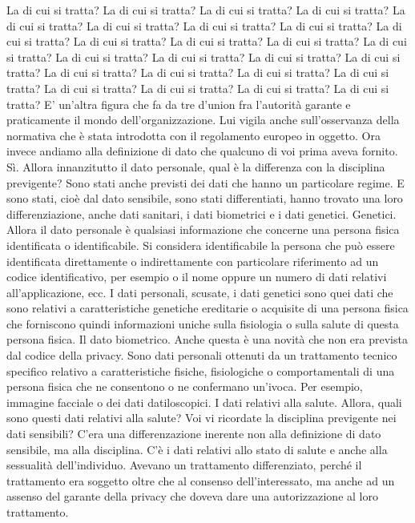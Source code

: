 La di cui si tratta?
La di cui si tratta?
La di cui si tratta?
La di cui si tratta?
La di cui si tratta?
La di cui si tratta?
La di cui si tratta?
La di cui si tratta?
La di cui si tratta?
La di cui si tratta?
La di cui si tratta?
La di cui si tratta?
La di cui si tratta?
La di cui si tratta?
La di cui si tratta?
La di cui si tratta?
La di cui si tratta?
La di cui si tratta?
La di cui si tratta?
La di cui si tratta?
La di cui si tratta?
La di cui si tratta?
La di cui si tratta?
La di cui si tratta?
La di cui si tratta?
E' un'altra figura che fa da tre d'union fra l'autorità garante e praticamente il mondo dell'organizzazione.
Lui vigila anche sull'osservanza della normativa che è stata introdotta con il regolamento europeo in oggetto.
Ora invece andiamo alla definizione di dato che qualcuno di voi prima aveva fornito.
Sì.
Allora innanzitutto il dato personale, qual è la differenza con la disciplina previgente?
Sono stati anche previsti dei dati che hanno un particolare regime.
E sono stati, cioè dal dato sensibile, sono stati differentiati, hanno trovato una loro differenziazione, anche dati sanitari, i dati biometrici e i dati genetici.
Genetici.
Allora il dato personale è qualsiasi informazione che concerne una persona fisica identificata o identificabile.
Si considera identificabile la persona che può essere identificata direttamente o indirettamente con particolare riferimento ad un codice identificativo, per esempio o il nome oppure un numero di dati relativi all'applicazione, ecc.
I dati personali, scusate, i dati genetici sono quei dati che sono relativi a caratteristiche genetiche ereditarie o acquisite di una persona fisica che forniscono quindi informazioni uniche sulla fisiologia o sulla salute di questa persona fisica.
Il dato biometrico.
Anche questa è una novità che non era prevista dal codice della privacy.
Sono dati personali ottenuti da un trattamento tecnico specifico relativo a caratteristiche fisiche, fisiologiche o comportamentali di una persona fisica che ne consentono o ne confermano un'ivoca.
Per esempio, immagine facciale o dei dati datiloscopici.
I dati relativi alla salute.
Allora, quali sono questi dati relativi alla salute?
Voi vi ricordate la disciplina previgente nei dati sensibili?
C'era una differenzazione inerente non alla definizione di dato sensibile, ma alla disciplina.
C'è i dati relativi allo stato di salute e anche alla sessualità dell'individuo.
Avevano un trattamento differenziato, perché il trattamento era soggetto oltre che al consenso dell'interessato, ma anche ad un assenso del garante della privacy che doveva dare una autorizzazione al loro trattamento.
